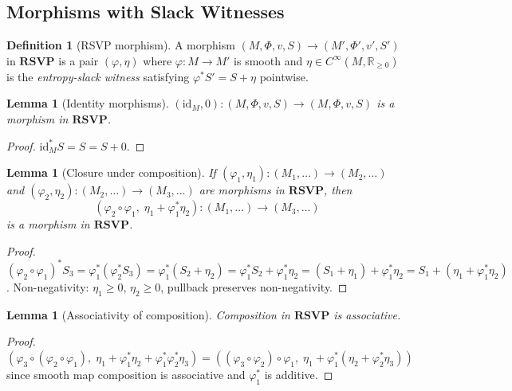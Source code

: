 \documentclass[12pt,a4paper]{article}
\newtheorem{lemma}[theorem]{Lemma}
\theoremstyle{definition}
\newtheorem{definition}[theorem]{Definition}
\theoremstyle{remark}
\newcommand{\Rnn}{\mathbb{R}_{\ge 0}}
\newcommand{\RSVP}{\mathbf{RSVP}}
\newcommand{\id}{\mathrm{id}}
\newcommand{\PhiF}{\Phi}
\newcommand{\vF}{v}
\newcommand{\SF}{S}
\begin{document}
\subsection{Morphisms with Slack Witnesses}

\begin{definition}[RSVP morphism]
\label{def:rsvp-morph}
A morphism $(M,\PhiF,\vF,\SF)\to(M',\PhiF',\vF',\SF')$ in $\RSVP$ is a pair
$(\varphi,\eta)$ where $\varphi:M\to M'$ is smooth and $\eta\in C^\infty(M,\Rnn)$
is the \emph{entropy-slack witness} satisfying $\varphi^*\SF'=\SF+\eta$ pointwise.
\end{definition}

\begin{lemma}[Identity morphisms]
\label{lem:rsvp-id}
$(\id_M,0):(M,\PhiF,\vF,\SF)\to(M,\PhiF,\vF,\SF)$ is a morphism in $\RSVP$.
\end{lemma}

\begin{proof}
$\id_M^*\SF=\SF=\SF+0$.
\end{proof}

\begin{lemma}[Closure under composition]
\label{lem:rsvp-compose}
If $(\varphi_1,\eta_1):(M_1,\ldots)\to(M_2,\ldots)$ and $(\varphi_2,\eta_2):
(M_2,\ldots)\to(M_3,\ldots)$ are morphisms in $\RSVP$, then
\[
  (\varphi_2\circ\varphi_1,\;\eta_1+\varphi_1^*\eta_2)
  :(M_1,\ldots)\to(M_3,\ldots)
\]
is a morphism in $\RSVP$.
\end{lemma}

\begin{proof}
$(\varphi_2\circ\varphi_1)^*\SF_3=\varphi_1^*(\varphi_2^*\SF_3)=\varphi_1^*(\SF_2+\eta_2)
=\varphi_1^*\SF_2+\varphi_1^*\eta_2=(\SF_1+\eta_1)+\varphi_1^*\eta_2
=\SF_1+(\eta_1+\varphi_1^*\eta_2)$.
Non-negativity: $\eta_1\ge 0$, $\eta_2\ge 0$, pullback preserves non-negativity.
\end{proof}

\begin{lemma}[Associativity of composition]
\label{lem:rsvp-assoc}
Composition in $\RSVP$ is associative.
\end{lemma}

\begin{proof}
$(\varphi_3\circ(\varphi_2\circ\varphi_1),\;\eta_1+\varphi_1^*\eta_2+\varphi_1^*\varphi_2^*
\eta_3)=((\varphi_3\circ\varphi_2)\circ\varphi_1,\;\eta_1+\varphi_1^*(\eta_2+\varphi_2^*
\eta_3))$ since smooth map composition is associative and $\varphi_1^*$ is additive.
\end{proof}
\end{document}

